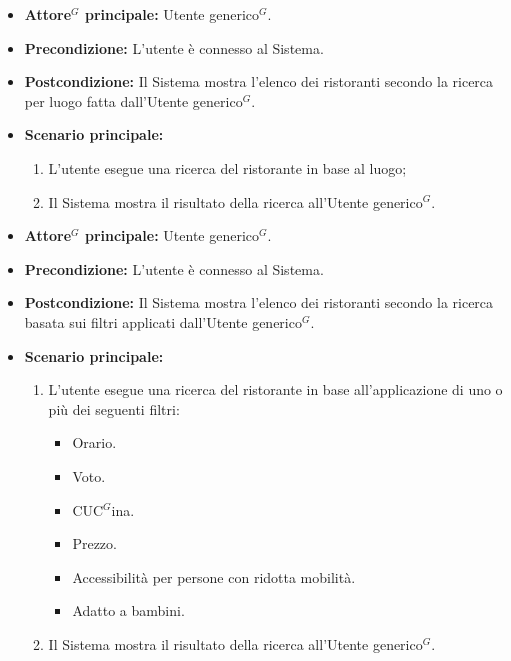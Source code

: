 \label{usecase:Ricerca ristoranti per luogo}
\begin{itemize}
	\item \textbf{\gls{Attore}$^G$ principale:} \gls{Utente generico}$^G$.

	\item \textbf{Precondizione:} L'utente è connesso al Sistema.

	\item \textbf{Postcondizione:} Il Sistema mostra l'elenco dei ristoranti secondo la ricerca per luogo fatta dall'\gls{Utente generico}$^G$.

	\item \textbf{Scenario principale:}
	      \begin{enumerate}
		      \item L'utente esegue una ricerca del ristorante in base al luogo;
		      \item Il Sistema mostra il risultato della ricerca all'\gls{Utente generico}$^G$.
	      \end{enumerate}
\end{itemize}


\label{usecase:Ricerca ristoranti per filtri}
\begin{itemize}
	\item \textbf{\gls{Attore}$^G$ principale:} \gls{Utente generico}$^G$.

	\item \textbf{Precondizione:} L'utente è connesso al Sistema.

	\item \textbf{Postcondizione:} Il Sistema mostra l'elenco dei ristoranti secondo la ricerca basata sui filtri applicati dall'\gls{Utente generico}$^G$.

	\item \textbf{Scenario principale:}
	      \begin{enumerate}
		      \item L'utente esegue una ricerca del ristorante in base all'applicazione di uno o più dei seguenti filtri:
		            \begin{itemize}
			            \item Orario.
			            \item Voto.
			            \item C\gls{UC}$^G$ina.
			            \item Prezzo.
			            \item Accessibilità per persone con ridotta mobilità.
			            \item Adatto a bambini.
		            \end{itemize}
		      \item Il Sistema mostra il risultato della ricerca all'\gls{Utente generico}$^G$.
	      \end{enumerate}
\end{itemize}
